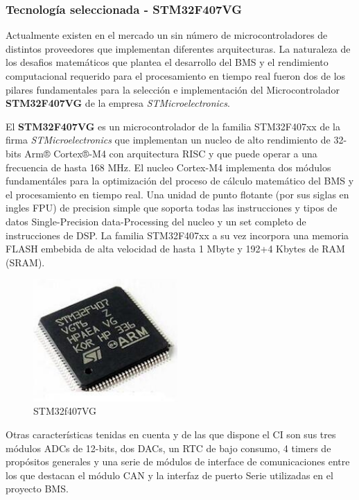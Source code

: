 \documentclass[10pt,a4paper]{article}
\begin{document}
\subsubsection{Tecnología seleccionada - STM32F407VG}

Actualmente existen en el mercado un sin número de microcontroladores de
distintos proveedores que implementan diferentes arquitecturas. La naturaleza de
los desafios matemáticos que plantea el desarrollo del \acrshort{BMS} y el
rendimiento computacional requerido para el procesamiento en tiempo real fueron
dos de los pilares fundamentales para la selección e implementación del
Microcontrolador \textbf{STM32F407VG} de la empresa \emph{STMicroelectronics}. 

El \textbf{STM32F407VG} es un microcontrolador de la familia STM32F407xx de la
firma \emph{STMicroelectronics} que implementan un nucleo de alto rendimiento de
32-bits Arm® Cortex®-M4 con arquitectura \acrshort{RISC} y que puede operar a
una frecuencia de hasta 168 MHz.  El nucleo Cortex-M4 implementa dos módulos
fundamentáles para la optimización del proceso de cálculo matemático del
\acrshort{BMS} y el procesamiento en tiempo real. Una unidad de punto flotante
(por sus siglas en ingles \acrfull{FPU}) de precision simple que soporta todas
las instrucciones y tipos de datos Single-Precision data-Processing del nucleo
y un set completo de instrucciones de \acrshort{DSP}. La familia STM32F407xx a
su vez incorpora una memoria FLASH embebida de alta velocidad de hasta 1 Mbyte y
192+4 Kbytes de RAM (\acrfull{SRAM}).

\begin{figure}
    \includegraphics[width=5.5cm]{STM32F407VG.png}
    \caption{STM32f407VG}
    \label{fig:stm32f407vg}                                                            
\end{figure}                                                                 

Otras características tenidas en cuenta y de las que dispone el \acrshort{CI}
son sus tres módulos ADCs de 12-bits, dos DACs, un \acrshort{RTC} de
bajo consumo, 4 timers de propósitos generales y una serie de módulos de
interface de comunicaciones entre los que destacan el módulo \acrshort{CAN} y la
interfaz de puerto Serie utilizadas en el proyecto \acrshort{BMS}.
\end{document}
